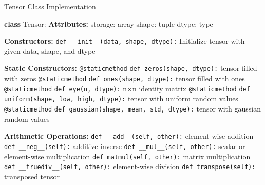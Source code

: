   \begin{algorithm}[H]
    \caption{Tensor Class Implementation}
    \begin{algorithmic}[1]
    \State \textbf{class} Tensor:
        \State \textbf{Attributes:}
        \State \hspace{1em}storage: array  
        \State \hspace{1em}shape: tuple    
        \State \hspace{1em}dtype: type     

        \State \textbf{Constructors:}
        \State \texttt{def \_\_init\_\_(data, shape, dtype):}
            \State \hspace{2em}Initialize tensor with given data, shape, and dtype

        \State \textbf{Static Constructors:}
        \State \texttt{@staticmethod}
        \State \texttt{def zeros(shape, dtype):}
            \State \hspace{2em}\Return tensor filled with zeros
        \State \texttt{@staticmethod}
        \State \texttt{def ones(shape, dtype):}
            \State \hspace{2em}\Return tensor filled with ones
        \State \texttt{@staticmethod}
        \State \texttt{def eye(n, dtype):}
            \State \hspace{2em}\Return n×n identity matrix
        \State \texttt{@staticmethod}
        \State \texttt{def uniform(shape, low, high, dtype):}
            \State \hspace{2em}\Return tensor with uniform random values
        \State \texttt{@staticmethod}
        \State \texttt{def gaussian(shape, mean, std, dtype):}
            \State \hspace{2em}\Return tensor with gaussian random values

        \State \textbf{Arithmetic Operations:}
        \State \texttt{def \_\_add\_\_(self, other):}
            \State \hspace{2em}\Return element-wise addition
        \State \texttt{def \_\_neg\_\_(self):}
            \State \hspace{2em}\Return additive inverse
        \State \texttt{def \_\_mul\_\_(self, other):}
            \State \hspace{2em}\Return scalar or element-wise multiplication
        \State \texttt{def matmul(self, other):}
            \State \hspace{2em}\Return matrix multiplication
        \State \texttt{def \_\_truediv\_\_(self, other):}
            \State \hspace{2em}\Return element-wise division
        \State \texttt{def transpose(self):}
            \State \hspace{2em}\Return transposed tensor


\end{algorithmic}
\end{algorithm}
